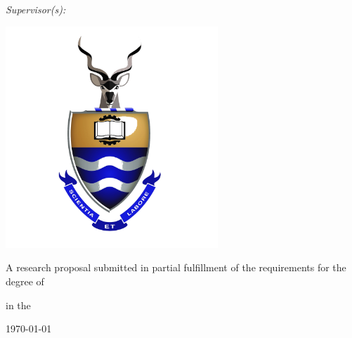 \documentclass[
12pt, %
oneside, %
english, %
onehalfspacing, %
nolistspacing, %
liststotoc, %
headsepline, %
]{ProposalAndThesis} %
\author{Willem Van Der Merwe} %
\begin{document}
\frontmatter %

\pagestyle{plain} %


\begin{titlepage}
\begin{center}

{\large \bfseries \ttitle}\par\vspace{0.4cm} %
\HRule\par\vspace{1.5cm}
\authorname\par\vspace{1cm}
\emph{Supervisor(s):}\par
{\supname}\par %
\par\vspace{0.5cm}

\includegraphics[width=80mm]{Figures/logoWitsstackedcolourtransparent.png} %
\vfill

A research proposal submitted in partial fulfillment of the requirements for the degree of \degreename\par\vspace{0.3cm}
in the\par\vspace{0.4cm}
\deptname\par\vspace{0.1cm} %
\univname\par\vspace{0.4cm} %
\cleanlookdateon
\today %

\end{center}

\end{titlepage}
\end{document}
